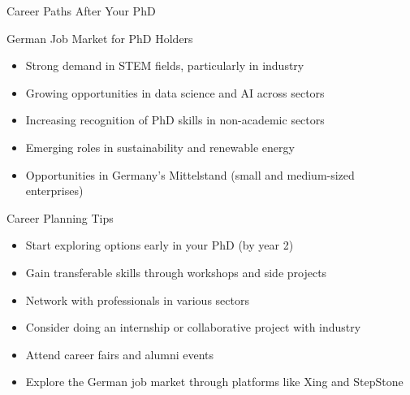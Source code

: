 \documentclass[aspectratio=169,10pt]{beamer}
\begin{document}
\begin{frame}{Career Paths After Your PhD}

\vspace{0.3cm}
\alert{German Job Market for PhD Holders}
\begin{itemize}
    \item Strong demand in STEM fields, particularly in industry
    \item Growing opportunities in data science and AI across sectors
    \item Increasing recognition of PhD skills in non-academic sectors
    \item Emerging roles in sustainability and renewable energy
    \item Opportunities in Germany's Mittelstand (small and medium-sized enterprises)
\end{itemize}

\alert{Career Planning Tips}
\begin{itemize}
    \item Start exploring options early in your PhD (by year 2)
    \item Gain transferable skills through workshops and side projects
    \item Network with professionals in various sectors
    \item Consider doing an internship or collaborative project with industry
    \item Attend career fairs and alumni events
    \item Explore the German job market through platforms like Xing and StepStone
\end{itemize}
\end{frame}
\end{document}
